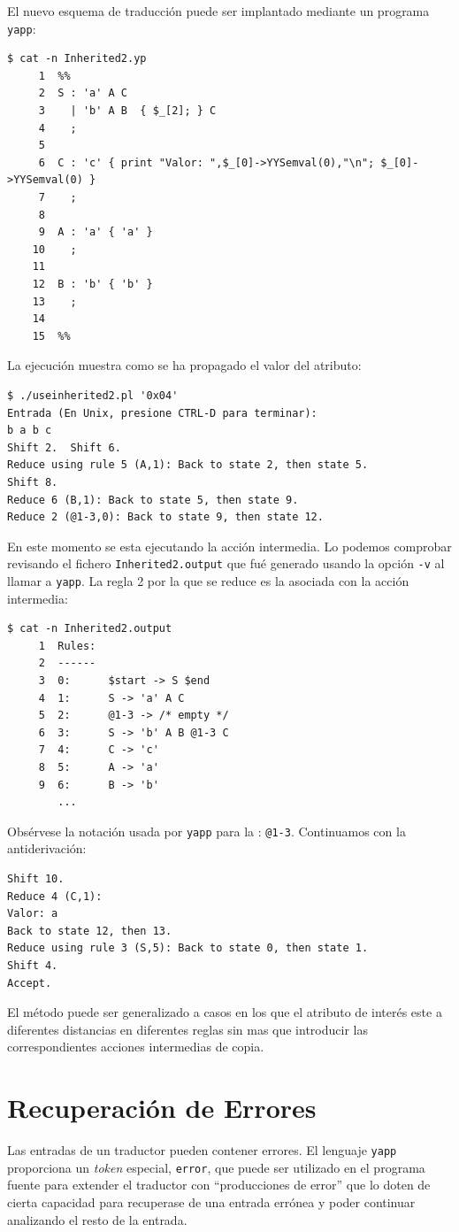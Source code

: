 El nuevo esquema de traducción puede ser implantado mediante
un programa \verb|yapp|:

\begin{verbatim}
$ cat -n Inherited2.yp
     1  %%
     2  S : 'a' A C
     3    | 'b' A B  { $_[2]; } C
     4    ;
     5
     6  C : 'c' { print "Valor: ",$_[0]->YYSemval(0),"\n"; $_[0]->YYSemval(0) }
     7    ;
     8
     9  A : 'a' { 'a' }
    10    ;
    11
    12  B : 'b' { 'b' }
    13    ;
    14
    15  %%
\end{verbatim}

La ejecución muestra como se ha propagado el valor del atributo:
\begin{verbatim}
$ ./useinherited2.pl '0x04'
Entrada (En Unix, presione CTRL-D para terminar):
b a b c
Shift 2.  Shift 6.
Reduce using rule 5 (A,1): Back to state 2, then state 5.
Shift 8.
Reduce 6 (B,1): Back to state 5, then state 9.
Reduce 2 (@1-3,0): Back to state 9, then state 12.
\end{verbatim}

En este momento se esta ejecutando la acción intermedia.
Lo podemos comprobar revisando el fichero \verb|Inherited2.output|
que fué generado usando la opción \verb|-v| al llamar a \verb|yapp|.
La regla 2 por la que se reduce es la asociada con la acción 
intermedia:

\begin{verbatim}
$ cat -n Inherited2.output
     1  Rules:
     2  ------
     3  0:      $start -> S $end
     4  1:      S -> 'a' A C
     5  2:      @1-3 -> /* empty */
     6  3:      S -> 'b' A B @1-3 C
     7  4:      C -> 'c'
     8  5:      A -> 'a'
     9  6:      B -> 'b'
        ...
\end{verbatim}

Obsérvese la notación usada por \verb|yapp| para la 
: \verb|@1-3|.
Continuamos con la antiderivación:

\begin{verbatim}
Shift 10.
Reduce 4 (C,1): 
Valor: a
Back to state 12, then 13.
Reduce using rule 3 (S,5): Back to state 0, then state 1.
Shift 4.
Accept.
\end{verbatim}

El método puede ser generalizado a casos en los
que el atributo de interés este a diferentes distancias en
diferentes reglas sin mas que introducir las correspondientes
acciones intermedias de copia.

\section{Recuperación de Errores}
\label{section:errores}
Las entradas de un traductor pueden contener errores. 
El lenguaje \verb|yapp| proporciona un \emph{token} especial,
\verb|error|, que puede ser utilizado en el programa fuente
para extender el traductor con ``producciones de error'' 
que lo doten de cierta capacidad para 
recuperase de  una entrada errónea y poder continuar 
analizando el resto de la entrada.

